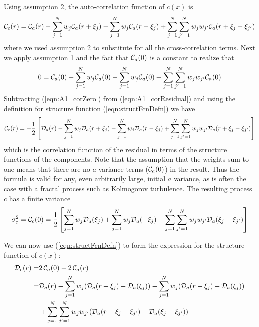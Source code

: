 \documentclass[11pt, oneside]{article}   	%
\begin{document}
\begin{appendix}
Using assumption 2, the auto-correlation function of $c(x)$ is
\begin{equation}
\label{eqn:A1_corResidual}
{\cal C}_c(r) = {\cal C}_a(r) - \sum_{j=1}^N w_j {\cal C}_a(r+\xi_j) - \sum_{j=1}^N w_j {\cal C}_a(r-\xi_j) + \sum_{j=1}^N \sum_{j'=1}^N w_j w_{j'} {\cal C}_a(r+\xi_j - \xi_{j'})
\end{equation}
where we used assumption 2 to substitute for all the cross-correlation terms. Next we apply assumption 1 and the fact that ${\cal C}_a(0)$ is a constant to realize that
\begin{equation}
\label{eqn:A1_corZero}
0 = {\cal C}_a(0) - \sum_{j=1}^N w_j {\cal C}_a(0) - \sum_{j=1}^N w_j {\cal C}_a(0) + \sum_{j=1}^N \sum_{j'=1}^N w_j w_{j'} {\cal C}_a(0)
\end{equation}
Subtracting (\ref{eqn:A1_corZero}) from (\ref{eqn:A1_corResidual}) and using the definition for structure function (\ref{eqn:structFcnDefn}) we have
\begin{equation}
\label{eqn:A1_finalCorResidual}
{\cal C}_c(r) = -\frac{1}{2} \left[ {\cal D}_a(r) - \sum_{j=1}^N w_j {\cal D}_a(r+\xi_j) - \sum_{j=1}^N w_j {\cal D}_a(r-\xi_j) + \sum_{j=1}^N \sum_{j'=1}^N w_j w_{j'} {\cal D}_a(r+\xi_j - \xi_{j'})\right ]
\end{equation}
which is the correlation function of the residual in terms of the structure functions of the components. Note that the assumption that the weights sum to one means that there are no $a$ variance terms (${\cal C}_a(0)$) in the result. Thus the formula is valid for any, even arbitrarily large, initial $a$ variance, as is often the case with a fractal process such as Kolmogorov turbulence. The resulting process $c$ has  a finite variance
\begin{equation}
\label{eqn:A1_finalVariance}
\sigma_c^2 = {\cal C}_c(0) = \frac{1}{2} \left[ \sum_{j=1}^N w_j {\cal D}_a(\xi_j) + \sum_{j=1}^N w_j {\cal D}_a(-\xi_j) - \sum_{j=1}^N \sum_{j'=1}^N w_j w_{j'} {\cal D}_a(\xi_j - \xi_{j'})\right ]
\end{equation}

We can now use (\ref{eqn:structFcnDefn}) to form the expression for the structure function of $c(x)$:
\begin{align}
{\cal D}_c(r) = &2\,{\cal C}_a(0) - 2\,{\cal C}_a(r) \nonumber \\
= &{\cal D}_a(r) 
  - \sum_{j=1}^N w_j ({\cal D}_a(r+\xi_j)-{\cal D}_a(\xi_j)) 
  - \sum_{j=1}^N w_j ({\cal D}_a(r-\xi_j)-{\cal D}_a(\xi_j)) \nonumber \\
&+\sum_{j=1}^N \sum_{j'=1}^N w_j w_{j'} ({\cal D}_a(r+\xi_j - \xi_{j'})-{\cal D}_a(\xi_j - \xi_{j'})) \label{eqn:A1_finalStrucFcn}
\end{align}


\end{appendix}
\end{document}
